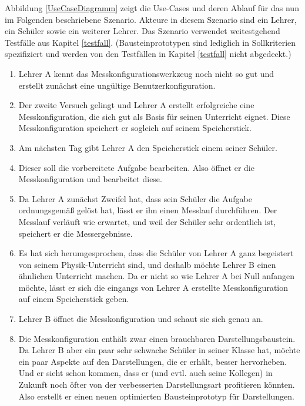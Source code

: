 \documentclass[parskip=full]{scrartcl}
\begin{document}
Abbildung \ref{UseCaseDiagramm} zeigt die Use-Cases und deren Ablauf für das nun im Folgenden beschriebene Szenario. Akteure in diesem Szenario sind ein Lehrer, ein Schüler sowie ein weiterer Lehrer. Das Szenario verwendet weitestgehend Testfälle aus Kapitel \ref{testfall}. (Bausteinprototypen sind lediglich in Sollkriterien spezifiziert und werden von den Testfällen in Kapitel \ref{testfall} nicht abgedeckt.)

\begin{enumerate}
	\item Lehrer A kennt das Messkonfigurationswerkzeug noch nicht so gut und erstellt zunächst eine ungültige \gls{Benutzerkonfiguration}. 
	
	\item Der zweite Versuch gelingt und Lehrer A erstellt erfolgreiche eine Messkonfiguration, die sich gut als Basis für seinen Unterricht eignet. Diese Messkonfiguration speichert er sogleich auf seinem Speicherstick.
	
	\item Am nächsten Tag gibt Lehrer A den Speicherstick einem seiner Schüler. 
	
	\item Dieser soll die vorbereitete Aufgabe bearbeiten. Also öffnet er die Messkonfiguration und bearbeitet diese.
	
	\item Da Lehrer A zunächst Zweifel hat, dass sein Schüler die Aufgabe ordnungsgemäß gelöst hat, lässt er ihn einen Messlauf durchführen. Der Messlauf verläuft wie erwartet, und weil der Schüler sehr ordentlich ist, speichert er die Messergebnisse.
	
	\item Es hat sich herumgesprochen, dass die Schüler von Lehrer A ganz begeistert von seinem Physik-Unterricht sind, und deshalb möchte Lehrer B einen ähnlichen Unterricht machen. Da er nicht so wie Lehrer A bei Null anfangen möchte, lässt er sich die eingangs von Lehrer A erstellte Messkonfiguration auf einem Speicherstick geben. 
	
	\item Lehrer B öffnet die Messkonfiguration und schaut sie sich genau an.
	
	\item Die Messkonfiguration enthält zwar einen brauchbaren Darstellungsbaustein. Da Lehrer B aber ein paar sehr schwache Schüler in seiner Klasse hat, möchte ein paar Aspekte auf den Darstellungen, die er erhält, besser hervorheben. Und er sieht schon kommen, dass er (und evtl. auch seine Kollegen) in Zukunft noch öfter von der verbesserten Darstellungsart profitieren könnten. Also erstellt er einen neuen optimierten Bausteinprototyp für Darstellungen.
	

\end{enumerate}
\end{document}
